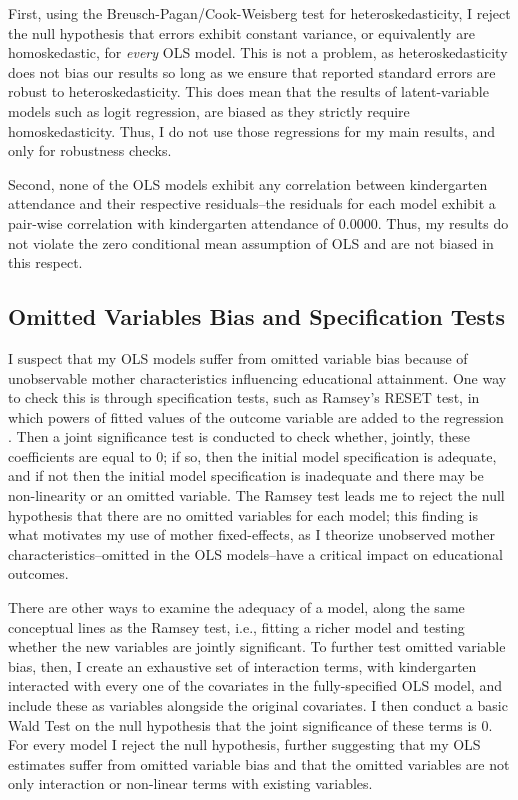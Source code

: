 First, using the Breusch-Pagan/Cook-Weisberg test for heteroskedasticity, I reject the null hypothesis that errors exhibit constant variance, or equivalently are homoskedastic, for \textit{every} OLS model. This is not a problem, as heteroskedasticity does not bias our results so long as we ensure that reported standard errors are robust to heteroskedasticity. This does mean that the results of latent-variable models such as logit regression, are biased as they strictly require homoskedasticity. Thus, I do not use those regressions for my main results, and only for robustness checks.

Second, none of the OLS models exhibit any correlation between kindergarten attendance and their respective residuals--the residuals for each model exhibit a pair-wise correlation with kindergarten attendance of 0.0000. Thus, my results do not violate the zero conditional mean assumption of OLS and are not biased in this respect. 

	\subsection{Omitted Variables Bias and Specification Tests}
I suspect that my OLS models suffer from omitted variable bias because of unobservable mother characteristics influencing educational attainment. One way to check this is through specification tests, such as Ramsey's RESET test, in which powers of fitted values of the outcome variable are added to the regression \citep{Long1992,Ramsey1969}. Then a joint significance test is conducted to check whether, jointly, these coefficients are equal to 0; if so, then the initial model specification is adequate, and if not then the initial model specification is inadequate and there may be non-linearity or an omitted variable. The Ramsey test leads me to reject the null hypothesis that there are no omitted variables for each model; this finding is what motivates my use of mother fixed-effects, as I theorize unobserved mother characteristics--omitted in the OLS models--have a critical impact on educational outcomes. 

There are other ways to examine the adequacy of a model, along the same conceptual lines as the Ramsey test, i.e., fitting a richer model and testing whether the new variables are jointly significant. To further test omitted variable bias, then, I create an exhaustive set of interaction terms, with kindergarten interacted with every one of the covariates in the fully-specified OLS model, and include these as variables alongside the original covariates. I then conduct a basic Wald Test on the null hypothesis that the joint significance of these terms is 0. For every model I reject the null hypothesis, further suggesting that my OLS estimates suffer from omitted variable bias and that the omitted variables are not only interaction or non-linear terms with existing variables.

